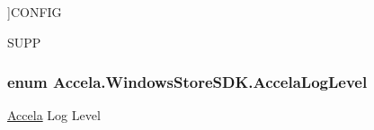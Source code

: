 \begin{Desc}
\begin{description}
{}]C\+O\+N\+F\+I\+G \item[{\em 
\hypertarget{namespace_accela_1_1_windows_store_s_d_k_a47577e6208bf1ae5cf34c33d54a3458cafd26ca4a0197c1a42794e2e47bb752b8}{S\+U\+P\+P}\label{namespace_accela_1_1_windows_store_s_d_k_a47577e6208bf1ae5cf34c33d54a3458cafd26ca4a0197c1a42794e2e47bb752b8}
}]S\+U\+P\+P \end{description}
\end{Desc}
\hypertarget{namespace_accela_1_1_windows_store_s_d_k_aaf389cdbcc309b77e2fabfcd0844454b}{
\subsubsection[{Accela\+Log\+Level}]{\setlength{\rightskip}{0pt plus 5cm}enum {\bf Accela.\+Windows\+Store\+S\+D\+K.\+Accela\+Log\+Level}}}\label{namespace_accela_1_1_windows_store_s_d_k_aaf389cdbcc309b77e2fabfcd0844454b}


\hyperlink{namespace_accela}{Accela} Log Level 

